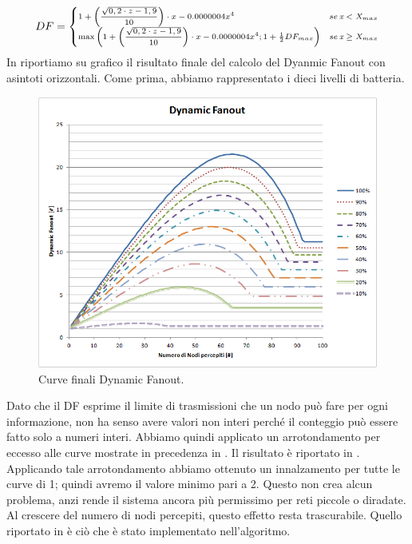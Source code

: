 \begin{equation}
\label{eq:DF_totale}
	\scriptsize
	DF = \begin{cases} 1 + \left( \dfrac{\sqrt{0,2\cdot z - 1,9}}{10} \right) \cdot x- 0.0000004x^4 & se\,\textit{x}<\textit{X}_{max}\\
						\max \left( 1 + \left( \dfrac{\sqrt{0,2\cdot z - 1,9}}{10} \right) \cdot x- 0.0000004x^4 ; 1 + \frac{1}{2}DF_{max} \right) & se\,\textit{x}\geq\textit{X}_{max}\end{cases}
	\normalsize
\end{equation}
In  riportiamo su grafico il risultato finale del calcolo del Dyanmic Fanout con asintoti orizzontali. Come prima, abbiamo rappresentato i dieci livelli di batteria.
\begin{figure}[t]
	\centering
	\includegraphics[width=0.9\linewidth]{Images/grafici_usati/DF_tot_no_arr}
	\caption[DF totale continuo]{Curve finali Dynamic Fanout.}
	\label{fig:DF_tot_no_arr}
\end{figure}

Dato che il DF esprime il limite di trasmissioni che un nodo può fare per ogni informazione, non ha senso avere valori non interi perché il conteggio può essere fatto solo a numeri interi. Abbiamo quindi applicato un arrotondamento per eccesso alle curve mostrate in precedenza in . Il risultato è riportato in . Applicando tale arrotondamento abbiamo ottenuto un innalzamento per tutte le curve di 1; quindi avremo il valore minimo pari a 2. Questo non crea alcun problema, anzi rende il sistema ancora più permissimo per reti piccole o diradate. Al crescere del numero di nodi percepiti, questo effetto resta trascurabile. Quello riportato in  è ciò che è stato implementato nell'algoritmo.

